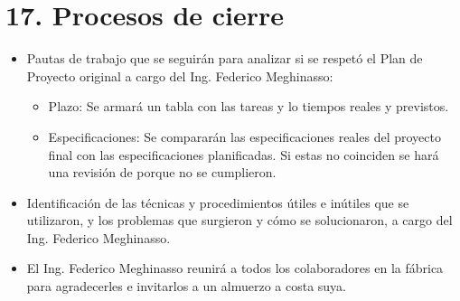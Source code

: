\documentclass[11pt]{charter}
\begin{document}
\section{17. Procesos de cierre}    
\label{sec:cierre}

\begin{itemize}
\item Pautas de trabajo que se seguirán para analizar si se respetó el Plan de Proyecto original a cargo del Ing. Federico Meghinasso:
\begin{itemize}
    \item Plazo: Se armará un tabla con las tareas y lo tiempos reales y previstos.
    \item Especificaciones: Se compararán las especificaciones reales del proyecto final con las especificaciones planificadas. Si estas no coinciden se hará una revisión de porque no se cumplieron.
\end{itemize}
\item Identificación de las técnicas y procedimientos útiles e inútiles que se utilizaron, y los problemas que surgieron y cómo se solucionaron, a cargo del Ing. Federico Meghinasso.
\item El Ing. Federico Meghinasso reunirá a todos los colaboradores en la fábrica para agradecerles e invitarlos a un almuerzo a costa suya.
\end{itemize}
\end{document}
